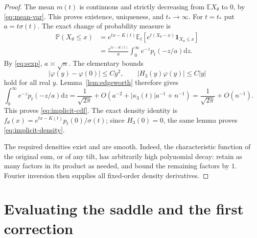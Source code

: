 \documentclass[11pt]{article}
\theoremstyle{remark}\newtheorem{remark}[theorem]{Remark}
\newcommand{\E}{\mathbb E}
\newcommand{\Prob}{\mathbb P}
\newcommand{\dd}{\mathrm d}
\begin{document}
\begin{proof}
The mean $m(t)$ is continuous and strictly decreasing from
$\E X_\theta$ to $0$, by \eqref{eq:mean-var}. This proves existence,
uniqueness, and $t_*\to\infty$.
For $t=t_*$ put $a=t\sigma(t)$. The exact change of probability measure is
\begin{align*}
 \Prob(X_\theta\leq x)
 &=e^{tx-K(t)}\E_t\left[e^{t(X_\theta-x)}
                              \mathbf1_{X_\theta\leq x}\right]\\
 &=\frac{e^{tx-K(t)}}a
    \int_0^\infty e^{-z}p_t(-z/a)\dd z.
\end{align*}
By \eqref{eq:sexp}, $a\asymp\sqrt n$. The elementary bounds
\[
 |\varphi(y)-\varphi(0)|\leq C y^2,
 \qquad |H_3(y)\varphi(y)|\leq C|y|
\]
hold for all real $y$. Lemma~\ref{lem:edgeworth} therefore gives
\[
 \int_0^\infty e^{-z}p_t(-z/a)\dd z
 =\frac1{\sqrt{2\pi}}
   +O(a^{-2}+|\kappa_3(t)|a^{-1}+n^{-1})
 =\frac1{\sqrt{2\pi}}+O(n^{-1}).
\]
This proves \eqref{eq:implicit-cdf}. The exact density identity is
$f_\theta(x)=e^{tx-K(t)}p_t(0)/\sigma(t)$; since $H_3(0)=0$, the
same lemma proves \eqref{eq:implicit-density}.

The required densities exist and are smooth. Indeed, the characteristic
function of the original sum, or of any tilt, has arbitrarily high
polynomial decay: retain as many factors in its product as needed, and
bound the remaining factors by $1$. Fourier inversion then supplies all
fixed-order density derivatives.
\end{proof}

\section{Evaluating the saddle and the first correction}
\end{document}

